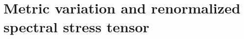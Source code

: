 \section{Metric variation and renormalized spectral stress tensor}
  \label{sec:metric-variation}

  
  
  
  
  
